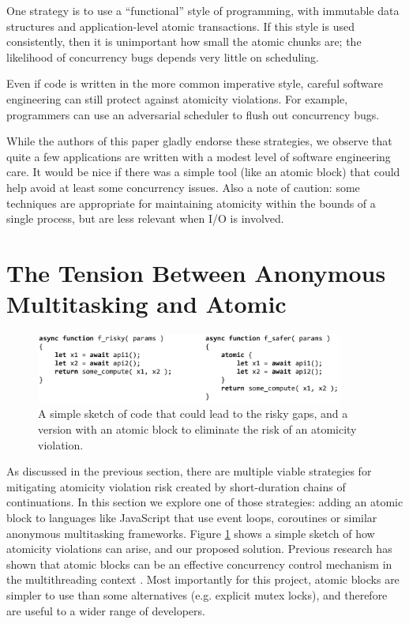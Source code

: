 \documentclass[acmsmall,anonymous,review]{acmart}\settopmatter{printfolios=true,printccs=false,printacmref=false}
\begin{document}
One strategy is to use a ``functional'' style of programming, with immutable data structures and application-level atomic transactions.
If this style is used consistently, then it is unimportant how small the atomic chunks are; the likelihood of concurrency bugs depends very little on scheduling.

Even if code is written in the more common imperative style, careful software engineering can still protect against atomicity violations.
For example, programmers can use an adversarial scheduler to flush out concurrency bugs.

While the authors of this paper gladly endorse these strategies, we observe that quite a few applications are written with a modest level of software engineering care.
It would be nice if there was a simple tool (like an atomic block) that could help avoid at least some concurrency issues.
Also a note of caution: some techniques are appropriate for maintaining atomicity within the bounds of a single process, but are less relevant when I/O is involved.

\section{The Tension Between Anonymous Multitasking and Atomic}

\begin{figure}
\includegraphics[width=0.9\textwidth]{Code/async_atomic_js}
\caption{A simple sketch of code that could lead to the risky gaps, and a version with an atomic block to eliminate the risk of an atomicity violation.}
\label{fig:async_atomic_js}
\end{figure}

As discussed in the previous section, there are multiple viable strategies for mitigating atomicity violation risk created by short-duration chains of continuations.
In this section we explore one of those strategies: adding an atomic block to languages like JavaScript that use event loops, coroutines or similar anonymous multitasking frameworks.
Figure \ref{fig:async_atomic_js} shows a simple sketch of how atomicity violations can arise, and our proposed solution.
Previous research has shown that atomic blocks can be an effective concurrency control mechanism in the multithreading context \cite{Pankratius2011, Pankratius2014}.
Most importantly for this project, atomic blocks are simpler to use than some alternatives (e.g. explicit mutex locks), and therefore are useful to a wider range of developers.
\end{document}
